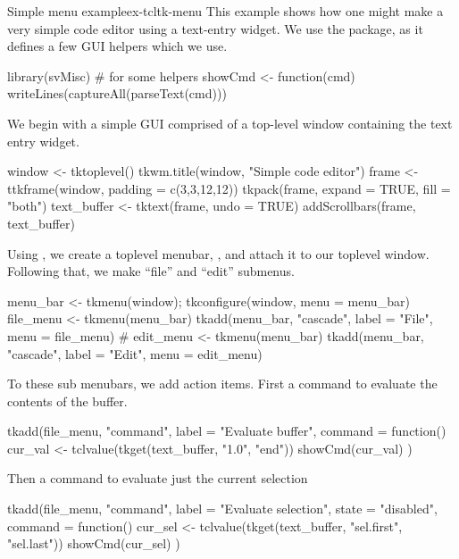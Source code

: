 \begin{example}{Simple menu example}{ex-tcltk-menu}
This example shows how one might make a very simple code editor using
a text-entry widget. We use the
 package, as it defines a few GUI helpers which we use.
\begin{Schunk}
\begin{Sinput}
 library(svMisc)                         # for some helpers
 showCmd <- function(cmd) {
   writeLines(captureAll(parseText(cmd)))
 }
\end{Sinput}
\end{Schunk}

We begin with a simple GUI comprised of a top-level window containing
the text entry widget.
\begin{Schunk}
\begin{Sinput}
 window <- tktoplevel()
 tkwm.title(window, "Simple code editor")
 frame <- ttkframe(window, padding = c(3,3,12,12)) 
 tkpack(frame, expand = TRUE, fill = "both")
 text_buffer <- tktext(frame, undo = TRUE)
 addScrollbars(frame, text_buffer)
\end{Sinput}
\end{Schunk}
%

Using , we create a toplevel menubar, , and
attach it to our toplevel window. Following that, we make ``file'' and ``edit'' submenus.
\begin{Schunk}
\begin{Sinput}
 menu_bar <- tkmenu(window); tkconfigure(window, menu = menu_bar)
 file_menu <- tkmenu(menu_bar)
 tkadd(menu_bar, "cascade", label = "File", menu = file_menu)
 #
 edit_menu <- tkmenu(menu_bar)
 tkadd(menu_bar, "cascade", label = "Edit", menu = edit_menu)
\end{Sinput}
\end{Schunk}
%

To these sub menubars, we add action items. First a command to
evaluate the contents of the buffer.
\begin{Schunk}
\begin{Sinput}
 tkadd(file_menu, "command", label = "Evaluate buffer",
       command = function() {
         cur_val <- tclvalue(tkget(text_buffer, "1.0", "end"))
         showCmd(cur_val)
       })
\end{Sinput}
\end{Schunk}

Then a command to evaluate just the current selection
\begin{Schunk}
\begin{Sinput}
 tkadd(file_menu, "command", label = "Evaluate selection",
       state = "disabled",
       command =  function() {
         cur_sel <- tclvalue(tkget(text_buffer, "sel.first", "sel.last"))
         showCmd(cur_sel)
       })
\end{Sinput}
\end{Schunk}


\end{example}
